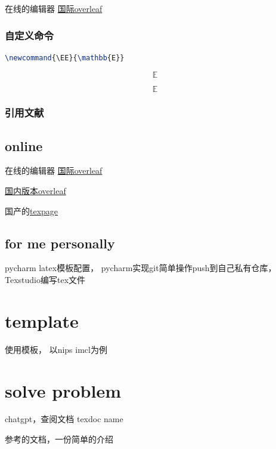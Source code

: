 \documentclass[11pt]{ctexart}
\newcommand{\EE}{\mathbb{E}}
\begin{document}
  在线的编辑器 \href{www.overleaf.com}{国际overleaf}
 
 \subsubsection{自定义命令}
 
 \begin{lstlisting}[language=tex]
 	\newcommand{\EE}{\mathbb{E}}
 \end{lstlisting}

\begin{equation}
	\mathbb{E}
\end{equation}

\begin{equation}
	\EE
\end{equation}
 
 \subsubsection{引用文献}
 
 \subsection{online}
 
 在线的编辑器 \href{www.overleaf.com}{国际overleaf}
 
 \href{cn.overleaf.com}{国内版本overleaf}
 
 国产的\href{www.texpage.com}{texpage}
 
 
 \subsection{for me personally}
 
 pycharm latex模板配置， pycharm实现git简单操作push到自己私有仓库，Texstudio编写tex文件
 
 \section{template}

使用模板， 以nips imcl为例\cite{kaelbling1996reinforcement}


\section{solve problem}

 chatgpt，查阅文档  texdoc name\cite{lecun2015deep}

参考的文档，一份简单的介绍\cite{de2019causal}
\end{document}
